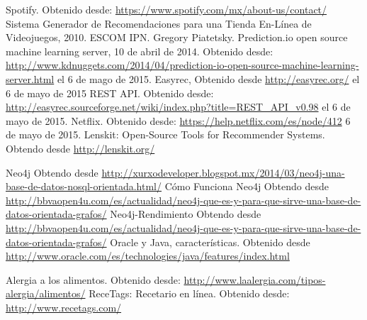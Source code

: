 \begin{thebibliography}{1}
     Spotify. Obtenido desde: \url{https://www.spotify.com/mx/about-us/contact/}
     Sistema Generador de Recomendaciones para una Tienda En-Línea de Videojuegos, 2010. ESCOM IPN. 
    Gregory Piatetsky. Prediction.io open source machine learning server, 10 de abril de 2014. Obtenido desde: \url{http://www.kdnuggets.com/2014/04/prediction-io-open-source-machine-learning-server.html} el 6 de mago de 2015. 
    Easyrec, Obtenido desde \url{http://easyrec.org/} el 6 de mayo de 2015 
    REST API. Obtenido desde: \url{http://easyrec.sourceforge.net/wiki/index.php?title=REST_API_v0.98} el 6 de mayo de 2015. 
    Netflix. Obtenido desde: \url{https://help.netflix.com/es/node/412} 6 de mayo de 2015.
    Lenskit: Open-Source Tools for Recommender Systems. Obtendo desde \url{http://lenskit.org/}

    Neo4j Obtendo desde \url{http://xurxodeveloper.blogspot.mx/2014/03/neo4j-una-base-de-datos-nosql-orientada.html/}
    Cómo Funciona Neo4j Obtendo desde \url{http://bbvaopen4u.com/es/actualidad/neo4j-que-es-y-para-que-sirve-una-base-de-datos-orientada-grafos/}
    Neo4j-Rendimiento Obtendo desde \url{http://bbvaopen4u.com/es/actualidad/neo4j-que-es-y-para-que-sirve-una-base-de-datos-orientada-grafos/}	
    Oracle y Java, características. Obtenido desde \url{http://www.oracle.com/es/technologies/java/features/index.html}

      Alergia a los alimentos. Obtenido desde: \url{http://www.laalergia.com/tipos-alergia/alimentos/}
      ReceTags: Recetario en línea. Obtenido desde: \url{http://www.recetags.com/}


\end{thebibliography}
